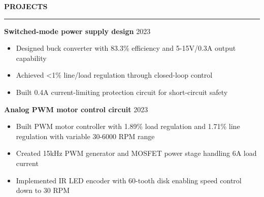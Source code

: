 \documentclass[notitlepage,10pt,a4paper]{article}
\newenvironment{resumesection}[1]{
    \header{#1}
}{}
\newcommand{\header}[1]{
    \vspace{2pt}
    \textcolor{accent1}{\Large \textbf{#1}}
    \vspace{6pt}\hrule\vspace{4pt}
}
\newcommand{\thingsep}{
    \vspace{4pt}
}
\begin{document}
\begin{resumesection}{PROJECTS}
    \raggedright
    \textcolor{accent2}{\textbf{\large Switched-mode power supply design}} \hfill {2023} \\
    {\small\begin{itemize}[noitemsep, font=\small, label={-}, leftmargin=*, topsep=0pt, partopsep=0pt]
        \item Designed buck converter with 83.3\% efficiency and 5-15V/0.3A output capability
        \item Achieved <1\% line/load regulation through closed-loop control
        \item Built 0.4A current-limiting protection circuit for short-circuit safety
    \end{itemize}}
    \thingsep

    \raggedright
    \textcolor{accent2}{\textbf{\large Analog PWM motor control circuit}} \hfill {2023} \\
    {\small\begin{itemize}[noitemsep, font=\small, label={-}, leftmargin=*, topsep=0pt, partopsep=0pt]
        \item Built PWM motor controller with 1.89\% load regulation and 1.71\% line regulation with variable 30-6000 RPM range
        \item Created 15kHz PWM generator and MOSFET power stage handling 6A load current
        \item Implemented IR LED encoder with 60-tooth disk enabling speed control down to 30 RPM
    \end{itemize}}
    \thingsep
    

\end{resumesection}
\end{document}
